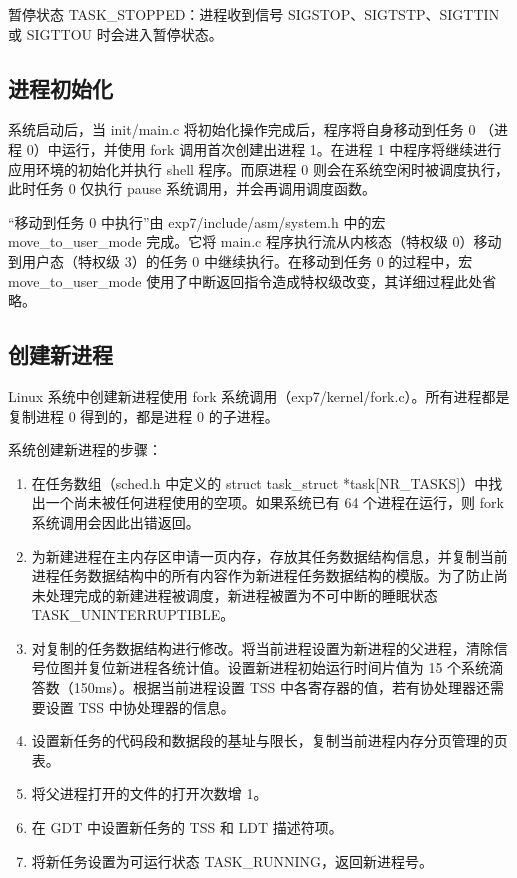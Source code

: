 暂停状态 TASK\_STOPPED：进程收到信号 SIGSTOP、SIGTSTP、SIGTTIN 或 SIGTTOU 时会进入暂停状态。

\subsection{进程初始化}

系统启动后，当 init/main.c 将初始化操作完成后，程序将自身移动到任务 0 （进程 0）中运行，并使用 fork 调用首次创建出进程 1。在进程 1 中程序将继续进行应用环境的初始化并执行 shell 程序。而原进程 0 则会在系统空闲时被调度执行，此时任务 0 仅执行 pause 系统调用，并会再调用调度函数。

“移动到任务 0 中执行”由 exp7/include/asm/system.h 中的宏 move\_to\_user\_mode 完成。它将 main.c 程序执行流从内核态（特权级 0）移动到用户态（特权级 3）的任务 0 中继续执行。在移动到任务 0 的过程中，宏 move\_to\_user\_mode 使用了中断返回指令造成特权级改变，其详细过程此处省略。

\subsection{创建新进程}

Linux 系统中创建新进程使用 fork 系统调用（exp7/kernel/fork.c）。所有进程都是复制进程 0 得到的，都是进程 0 的子进程。

系统创建新进程的步骤：

\begin{enumerate}
    \item 在任务数组（sched.h 中定义的 struct task\_struct *task[NR\_TASKS]）中找出一个尚未被任何进程使用的空项。如果系统已有 64 个进程在运行，则 fork 系统调用会因此出错返回。
    \item 为新建进程在主内存区申请一页内存，存放其任务数据结构信息，并复制当前进程任务数据结构中的所有内容作为新进程任务数据结构的模版。为了防止尚未处理完成的新建进程被调度，新进程被置为不可中断的睡眠状态 TASK\_UNINTERRUPTIBLE。
    \item 对复制的任务数据结构进行修改。将当前进程设置为新进程的父进程，清除信号位图并复位新进程各统计值。设置新进程初始运行时间片值为 15 个系统滴答数（150ms）。根据当前进程设置 TSS 中各寄存器的值，若有协处理器还需要设置 TSS 中协处理器的信息。
    \item 设置新任务的代码段和数据段的基址与限长，复制当前进程内存分页管理的页表。
    \item 将父进程打开的文件的打开次数增 1。
    \item 在 GDT 中设置新任务的 TSS 和 LDT 描述符项。
    \item 将新任务设置为可运行状态 TASK\_RUNNING，返回新进程号。
\end{enumerate}

